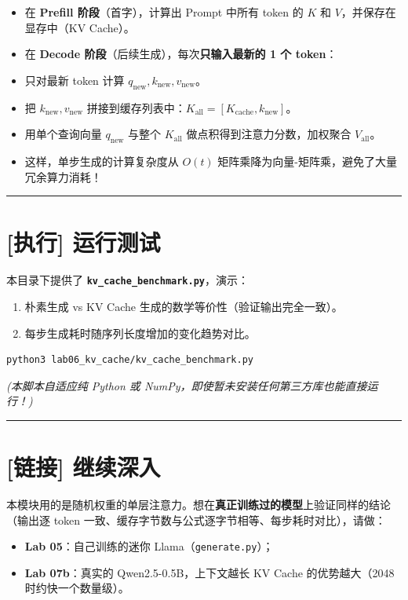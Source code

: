 \begin{itemize}
  \item 在 \textbf{Prefill 阶段}（首字），计算出 Prompt 中所有 token 的 $K$ 和 $V$，并保存在显存中（KV Cache）。
  \item 在 \textbf{Decode 阶段}（后续生成），每次\textbf{只输入最新的 1 个 token}：
  \item 只对最新 token 计算 $q_{\text{new}}, k_{\text{new}}, v_{\text{new}}$。
  \item 把 $k_{\text{new}}, v_{\text{new}}$ 拼接到缓存列表中：$K_{\text{all}} = [K_{\text{cache}}, k_{\text{new}}]$。
  \item 用单个查询向量 $q_{\text{new}}$ 与整个 $K_{\text{all}}$ 做点积得到注意力分数，加权聚合 $V_{\text{all}}$。
  \item 这样，单步生成的计算复杂度从 $O(t)$ 矩阵乘降为向量-矩阵乘，避免了大量冗余算力消耗！
\end{itemize}

\vspace{0.8em}\hrule\vspace{0.8em}

\section{[执行] 运行测试}

本目录下提供了 \textbf{\texttt{kv\_cache\_benchmark.py}}，演示：
\begin{enumerate}
  \item 朴素生成 vs KV Cache 生成的数学等价性（验证输出完全一致）。
  \item 每步生成耗时随序列长度增加的变化趋势对比。
\end{enumerate}

\begin{lstlisting}[language=bash]
python3 lab06_kv_cache/kv_cache_benchmark.py
\end{lstlisting}

\textit{(本脚本自适应纯 Python 或 NumPy，即使暂未安装任何第三方库也能直接运行！)}

\vspace{0.8em}\hrule\vspace{0.8em}

\section{[链接] 继续深入}

本模块用的是随机权重的单层注意力。想在\textbf{真正训练过的模型}上验证同样的结论（输出逐 token 一致、缓存字节数与公式逐字节相等、每步耗时对比），请做：
\begin{itemize}
  \item {}\textbf{Lab 05}：自己训练的迷你 Llama（\texttt{generate.py}）；
  \item {}\textbf{Lab 07b}：真实的 Qwen2.5-0.5B，上下文越长 KV Cache 的优势越大（2048 时约快一个数量级）。
\end{itemize}

